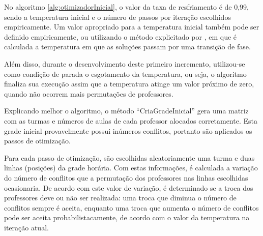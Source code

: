 No algoritmo \ref{alg:otimizadorInicial}, o valor da taxa de resfriamento é de 0,99, sendo a temperatura inicial e o número de passos por iteração escolhidos empiricamente. Um valor apropriado para a temperatura inicial também pode ser definido empiricamente, ou utilizando o método explicitado por , em que é calculada a temperatura em que as soluções passam por uma transição de fase.

Além disso, durante o desenvolvimento deste primeiro incremento, utilizou-se como condição de parada o esgotamento da temperatura, ou seja, o algoritmo finaliza sua execução assim que a temperatura atinge um valor próximo de zero, quando não ocorrem mais permutações de professores.

Explicando melhor o algoritmo, o método ``CriaGradeInicial''  gera uma matriz com as turmas e números de aulas de cada professor alocados corretamente. Esta grade inicial provavelmente possui inúmeros conflitos, portanto são aplicados os passos de otimização. 

Para cada passo de otimização, são escolhidas aleatoriamente uma turma e duas linhas (posições) da grade horária. Com estas informações, é calculada a variação do número de conflitos que a permutação dos professores nas linhas escolhidas ocasionaria. De acordo com este valor de variação, é determinado se a troca dos professores deve ou não ser realizada: uma troca que diminua o número de conflitos sempre é aceita, enquanto uma troca que aumenta o número de conflitos pode ser aceita probabilistacamente, de acordo com o valor da temperatura na iteração atual.


